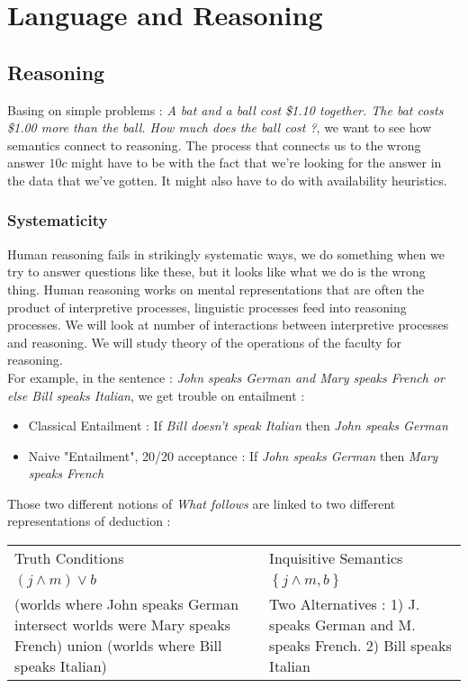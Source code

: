 \documentclass{cours}
\begin{document}
\section[Class 9\! : 07/12]{Language and Reasoning}
\subsection{Reasoning}
Basing on simple problems\! : \textsl{A bat and a ball cost \$1.10 together. The bat costs \$1.00 more than the ball. How much does the ball cost ?}, we want to see how semantics connect to reasoning. The process that connects us to the wrong answer $10c$ might have to be with the fact that we're looking for the answer in the data that we've gotten. It might also have to do with availability heuristics.
\subsubsection{Systematicity}
Human reasoning fails in strikingly systematic ways, we do something when we try to answer questions like these, but it looks like what we do is the wrong thing. Human reasoning works on mental representations that are often the product of interpretive processes, linguistic processes feed into reasoning processes. We will look at number of interactions between interpretive processes and reasoning. We will study theory of the operations of the faculty for reasoning. \\
For example, in the sentence\! : \textsl{John speaks German and Mary speaks French or else Bill speaks Italian}, we get trouble on entailment\! : 
\begin{itemize}
    \item Classical Entailment\! : If \textsl{Bill doesn't speak Italian} then \textsl{John speaks German}
    \item Naive "Entailment", 20/20 acceptance\! : If \textsl{John speaks German} then \textsl{Mary speaks French}
\end{itemize}
Those two different notions of \textit{What follows} are linked to two different representations of deduction\! : 
\begin{center}
    \begin{tabular}{p{}p{}}
        Truth Conditions & Inquisitive Semantics \\
        $(j \wedge m) \lor b$ & $\left\{j \land m, b\right\}$\\
       (worlds where John speaks German intersect worlds were Mary speaks French) union (worlds where Bill speaks Italian) & Two Alternatives\! : 1) J. speaks German and M. speaks French. 2) Bill speaks Italian
    \end{tabular}
\end{center}
\end{document}
